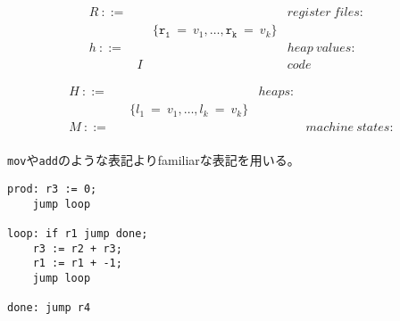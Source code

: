 \documentclass[a4paper,oneside]{ltjsarticle}
\begin{document}
\begin{figure}[ht]
	\noindent\hrulefill

	\begin{minipage}[h]{.48\textwidth}
		\begin{align*}
			&R\ \mathtt{::=}&&&register\ files:&\\
			&&&\{\mathtt{r_1\ =\ }v_1,\dots ,\mathtt{r_k\ =\ }v_k\}&&&\\
			&h\ \mathtt{::=}&&&heap\ values:&\\
			&&I&&code&
		\end{align*}
	\end{minipage}\hfill%
	\begin{minipage}[h]{.48\textwidth}
		\hfill\begin{align*}
			&H\ \mathtt{::=}&&&heaps:&\\
			&&&\{l_1\ =\ v_1,\dots ,l_k\ =\ v_k\}&&&\\
			&M\ \mathtt{::=}&&&&machine\ states:&\\
		\end{align*}
	\end{minipage}

	\noindent\hrulefill
\end{figure}

\texttt{mov}や\texttt{add}のような表記よりfamiliarな表記を用いる。

\begin{lstlisting}
prod: r3 := 0;
    jump loop

loop: if r1 jump done;
    r3 := r2 + r3;
    r1 := r1 + -1;
    jump loop

done: jump r4
\end{lstlisting}
\end{document}
